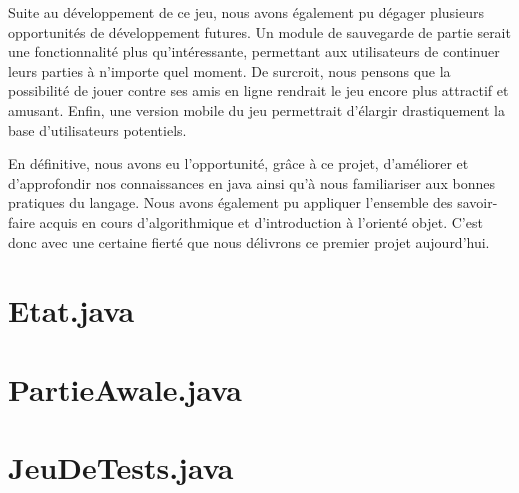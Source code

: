 \documentclass[11pt,a4paper]{report}
\begin{document}
\par
Suite au développement de ce jeu, nous avons également pu dégager plusieurs opportunités de développement futures. Un module de sauvegarde de partie serait une fonctionnalité plus qu'intéressante, permettant aux utilisateurs de continuer leurs parties à n’importe quel moment. De surcroit, nous pensons que la possibilité de jouer contre ses amis en ligne rendrait le jeu encore plus attractif et amusant. Enfin, une version mobile du jeu permettrait d'élargir drastiquement la base d'utilisateurs potentiels.
\par
En définitive, nous avons eu l'opportunité, grâce à ce projet, d’améliorer et d'approfondir nos connaissances en java ainsi qu’à nous familiariser aux bonnes pratiques du langage. Nous avons également pu appliquer l'ensemble des savoir-faire acquis en cours d'algorithmique et d'introduction à l'orienté objet. C'est donc avec une certaine fierté que nous délivrons ce premier projet aujourd'hui.
    \endgroup

    \appendix

    \chapter{Etat.java}
    

    \chapter{PartieAwale.java}
    

    \chapter{JeuDeTests.java}
    
\end{document}
